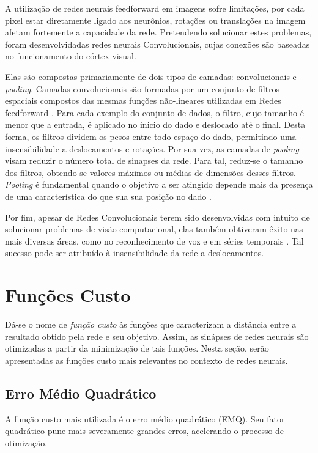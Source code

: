 A utilização de redes neurais feedforward em imagens sofre limitações, por cada pixel estar diretamente ligado aos neurônios, rotações ou translações na imagem afetam fortemente a capacidade da rede. Pretendendo solucionar estes problemas, foram desenvolvidadas redes neurais Convolucionais, cujas conexões são baseadas no funcionamento do córtex visual.

Elas são compostas primariamente de dois tipos de camadas: convolucionais e \textit{pooling}. Camadas convolucionais são formadas por um conjunto de filtros espaciais compostos das mesmas funções não-lineares utilizadas em Redes feedforward \cite{goodfellow16}. Para cada exemplo do conjunto de dados, o filtro, cujo tamanho é menor que a entrada, é aplicado no inicio do dado e deslocado até o final. Desta forma, os filtros dividem os pesos entre todo espaço do dado, permitindo uma insensibilidade a deslocamentos e rotações. Por sua vez, as camadas de \textit{pooling} visam reduzir o número total de sinapses da rede. Para tal, reduz-se o tamanho dos filtros, obtendo-se valores máximos ou médias de dimensões desses filtros. \textit{Pooling} é fundamental quando o objetivo a ser atingido depende mais da presença de uma característica do que sua sua posição no dado \cite{goodfellow16}.

Por fim, apesar de Redes Convolucionais terem sido desenvolvidas com intuito de solucionar problemas de visão computacional, elas também obtiveram êxito nas mais diversas áreas, como no reconhecimento de voz e em séries temporais \cite{lecun95}. Tal sucesso pode ser atribuído à insensibilidade da rede a deslocamentos.

\section{Funções Custo} \label{sec:custo}

Dá-se o nome de \textit{função custo} às funções que caracterizam a distância entre a resultado obtido pela rede e seu objetivo. Assim, as sinápses de redes neurais são otimizadas a partir da minimização de tais funções. Nesta seção, serão apresentadas as funções custo mais relevantes no contexto de redes neurais.

\subsection{Erro Médio Quadrático}

A função custo mais utilizada é o erro médio quadrático (EMQ). Seu fator quadrático pune mais severamente grandes erros, acelerando o processo de otimização.

